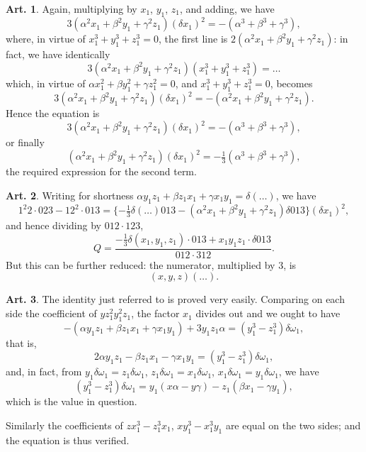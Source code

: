 \documentclass[12pt,a4paper]{article}
\theoremstyle{definition}
\newtheorem{art}{Art.}[section]
\begin{document}
\begin{art}\label{art:102}
Again, multiplying by $x_1$, $y_1$, $z_1$, and adding, we have
\[
3(\alpha^2 x_1 + \beta^2 y_1 + \gamma^2 z_1)(\delta x_1)^2 = -(\alpha^3 + \beta^3 + \gamma^3),
\]
where, in virtue of $x_1^3 + y_1^3 + z_1^3 = 0$, the first line is $2(\alpha^2 x_1 + \beta^2 y_1 + \gamma^2 z_1)$: in fact, we have identically
\[
3(\alpha^2 x_1 + \beta^2 y_1 + \gamma^2 z_1)(x_1^3 + y_1^3 + z_1^3) = \ldots
\]
which, in virtue of $\alpha x_1^2 + \beta y_1^2 + \gamma z_1^2 = 0$, and $x_1^3 + y_1^3 + z_1^3 = 0$, becomes
\[
3(\alpha^2 x_1 + \beta^2 y_1 + \gamma^2 z_1)(\delta x_1)^2 = -(\alpha^2 x_1 + \beta^2 y_1 + \gamma^2 z_1).
\]
Hence the equation is
\[
3(\alpha^2 x_1 + \beta^2 y_1 + \gamma^2 z_1)(\delta x_1)^2 = -(\alpha^3 + \beta^3 + \gamma^3),
\]
or finally
\[
(\alpha^2 x_1 + \beta^2 y_1 + \gamma^2 z_1)(\delta x_1)^2 = -\tfrac{1}{3}(\alpha^3 + \beta^3 + \gamma^3),
\]
the required expression for the second term.
\end{art}

\begin{art}\label{art:103}
Writing for shortness $\alpha y_1 z_1 + \beta z_1 x_1 + \gamma x_1 y_1 = \delta(\ldots)$, we have
\[
1^2 2 \cdot 023 - 12^2 \cdot 013 = \{-\tfrac{1}{3}\delta(\ldots)013 - (\alpha^2 x_1 + \beta^2 y_1 + \gamma^2 z_1)\delta 013\}(\delta x_1)^2,
\]
and hence dividing by $012 \cdot 123$,
\[
Q = \frac{-\frac{1}{3}\delta(x_1, y_1, z_1) \cdot 013 + x_1 y_1 z_1 \cdot \delta 013}{012 \cdot 312}.
\]
But this can be further reduced: the numerator, multiplied by $3$, is
\[
(x, y, z)(\ldots).
\]
\end{art}

\newpage
\begin{art}\label{art:104}
The identity just referred to is proved very easily. Comparing on each side the coefficient of $yz_1^2 y_1^2 z_1$, the factor $x_1$ divides out and we ought to have
\[
-(\alpha y_1 z_1 + \beta z_1 x_1 + \gamma x_1 y_1) + 3y_1 z_1 \alpha = (y_1^3 - z_1^3)\delta\omega_1,
\]
that is,
\[
2\alpha y_1 z_1 - \beta z_1 x_1 - \gamma x_1 y_1 = (y_1^3 - z_1^3)\delta\omega_1,
\]
and, in fact, from $y_1\delta\omega_1 = z_1\delta\omega_1$, $z_1\delta\omega_1 = x_1\delta\omega_1$, $x_1\delta\omega_1 = y_1\delta\omega_1$, we have
\[
(y_1^3 - z_1^3)\delta\omega_1 = y_1(x\alpha - y\gamma) - z_1(\beta x_1 - \gamma y_1),
\]
which is the value in question.

Similarly the coefficients of $zx_1^3 - z_1^3 x_1$, $xy_1^3 - x_1^3 y_1$ are equal on the two sides; and the equation is thus verified.
\end{art}
\end{document}
